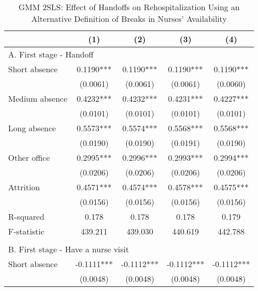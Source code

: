 \documentclass[final,12pt, notitlepage]{article}
\begin{document}
\begin{singlespace}
\begin{table}[H]
\footnotesize
\setlength\tabcolsep{0pt}
\centering
\caption{GMM 2SLS: Effect of Handoffs on Rehospitalization Using an Alternative Definition of Breaks in Nurses' Availability}
\label{tab:iv_robust}
\begin{threeparttable}
{
\def\sym#1{\ifmmode^{#1}\else\(^{#1}\)\fi}
\begin{tabular*}{\textwidth}{l@{\extracolsep{\fill}}*{4}{c}} %
\toprule
                    &\multicolumn{1}{c}{(1)}&\multicolumn{1}{c}{(2)}&\multicolumn{1}{c}{(3)}&\multicolumn{1}{c}{(4)}\\
\midrule
\multicolumn{5}{l}{A. First stage - Handoff} \\
Short absence       &      0.1190***&      0.1190***&      0.1190***&      0.1190***\\
                    &    (0.0061)   &    (0.0061)   &    (0.0061)   &    (0.0060)   \\
Medium absence      &      0.4232***&      0.4232***&      0.4231***&      0.4227***\\
                    &    (0.0101)   &    (0.0101)   &    (0.0101)   &    (0.0101)   \\
Long absence        &      0.5573***&      0.5574***&      0.5568***&      0.5568***\\
                    &    (0.0190)   &    (0.0190)   &    (0.0191)   &    (0.0190)   \\
Other office        &      0.2995***&      0.2996***&      0.2993***&      0.2994***\\
                    &    (0.0206)   &    (0.0206)   &    (0.0206)   &    (0.0206)   \\
Attrition           &      0.4571***&      0.4574***&      0.4578***&      0.4575***\\
                    &    (0.0156)   &    (0.0156)   &    (0.0156)   &    (0.0156)   \\
R-squared           &       0.178   &       0.178   &       0.178   &       0.179   \\
F-statistic         &     439.211   &     439.030   &     440.619   &     442.788   \\
\\
\multicolumn{5}{l}{B. First stage - Have a nurse visit} \\
Short absence       &     -0.1111***&     -0.1112***&     -0.1112***&     -0.1112***\\
                    &    (0.0048)   &    (0.0048)   &    (0.0048)   &    (0.0048)   \\

\end{tabular*}}
\end{threeparttable}
\end{table}
\end{singlespace}
\end{document}
